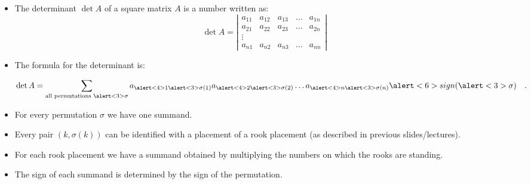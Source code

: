 \begin{frame}

\begin{itemize}
\item The determinant $\det A$ of a square matrix $A$ is a number written as:
\[
\det A= \left|\begin{array}{ccccc}
a_{11} & a_{12} & a_{13}& \dots & a_{1n}\\
a_{21} & a_{22} & a_{23}& \dots & a_{2n}\\
\vdots \\
a_{n1} & a_{n2} & a_{n3}& \dots & a_{nn}
\end{array} \right|
\]
\item<2-> The formula for the determinant is:

\[\det A=\sum_{\text{all permutations }\alert<3>{\sigma}} a_{\alert<4>{1\alert<3>{\sigma}(1)}} a_{\alert<4>{2\alert<3>{\sigma}(2)}} \dots a_{\alert<4>{n\alert<3>{\sigma}(n)}} \alert<6>{ sign(\alert<3>{\sigma})} \quad .
\]
\item<3-> For every permutation $\sigma$ we have one summand.
\item<4-> Every pair $(k,\sigma(k))$ can be identified with a placement of a rook placement (as described in previous slides/lectures).
\item<5-> For each rook placement we have a summand obtained by multiplying the numbers on which the rooks are standing.
\item<6-> The sign of each summand is determined by the sign of the permutation.
\end{itemize}

\vskip 10cm
\end{frame}
